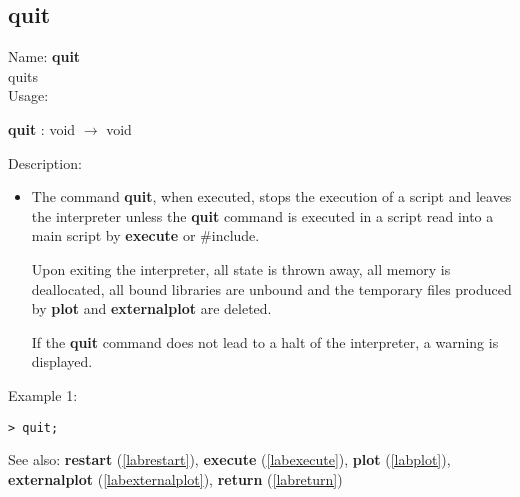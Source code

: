 \subsection{quit}
\label{labquit}
\noindent Name: \textbf{quit}\\
\phantom{aaa}quits \sollya\\[0.2cm]
\noindent Usage: 
\begin{center}
\textbf{quit} : \textsf{void} $\rightarrow$ \textsf{void}\\
\end{center}
\noindent Description: \begin{itemize}

\item The command \textbf{quit}, when executed, stops the execution of a \sollya
   script and leaves the \sollya interpreter unless the \textbf{quit} command 
   is executed in a \sollya script read into a main \sollya script by
   \textbf{execute} or $\#$include.
    
   Upon exiting the \sollya interpreter, all state is thrown away, all
   memory is deallocated, all bound libraries are unbound and the
   temporary files produced by \textbf{plot} and \textbf{externalplot} are deleted.
    
   If the \textbf{quit} command does not lead to a halt of the \sollya
   interpreter, a warning is displayed.
\end{itemize}
\noindent Example 1: 
\begin{center}\begin{minipage}{15cm}\begin{Verbatim}[frame=single]
> quit;
\end{Verbatim}
\end{minipage}\end{center}
See also: \textbf{restart} (\ref{labrestart}), \textbf{execute} (\ref{labexecute}), \textbf{plot} (\ref{labplot}), \textbf{externalplot} (\ref{labexternalplot}), \textbf{return} (\ref{labreturn})
